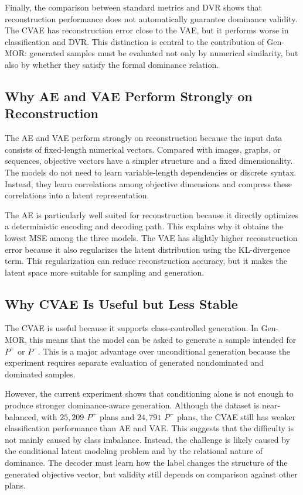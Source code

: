 Finally, the comparison between standard metrics and DVR shows that reconstruction performance does not automatically guarantee dominance validity. The CVAE has reconstruction error close to the VAE, but it performs worse in classification and DVR. This distinction is central to the contribution of Gen-MOR: generated samples must be evaluated not only by numerical similarity, but also by whether they satisfy the formal dominance relation.

\subsection{Why AE and VAE Perform Strongly on Reconstruction}
\label{subsec:why_ae_vae_reconstruct_well}

The AE and VAE perform strongly on reconstruction because the input data consists of fixed-length numerical vectors. Compared with images, graphs, or sequences, objective vectors have a simpler structure and a fixed dimensionality. The models do not need to learn variable-length dependencies or discrete syntax. Instead, they learn correlations among objective dimensions and compress these correlations into a latent representation.

The AE is particularly well suited for reconstruction because it directly optimizes a deterministic encoding and decoding path. This explains why it obtains the lowest MSE among the three models. The VAE has slightly higher reconstruction error because it also regularizes the latent distribution using the KL-divergence term. This regularization can reduce reconstruction accuracy, but it makes the latent space more suitable for sampling and generation.

\subsection{Why CVAE Is Useful but Less Stable}
\label{subsec:why_cvae_useful_less_stable}

The CVAE is useful because it supports class-controlled generation. In Gen-MOR, this means that the model can be asked to generate a sample intended for $P^{+}$ or $P^{-}$. This is a major advantage over unconditional generation because the experiment requires separate evaluation of generated nondominated and dominated samples.

However, the current experiment shows that conditioning alone is not enough to produce stronger dominance-aware generation. Although the dataset is near-balanced, with $25{,}209$ $P^{+}$ plans and $24{,}791$ $P^{-}$ plans, the CVAE still has weaker classification performance than AE and VAE. This suggests that the difficulty is not mainly caused by class imbalance. Instead, the challenge is likely caused by the conditional latent modeling problem and by the relational nature of dominance. The decoder must learn how the label changes the structure of the generated objective vector, but validity still depends on comparison against other plans.

